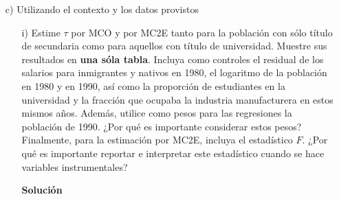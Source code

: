 \documentclass[a4paper, answers, addpoints, 11pt]{exam}
\newenvironment{solucion}{%
  \begin{mdframed}[
    backgroundcolor=blue!5,    %
    linecolor=blue!50,          %
    linewidth=2pt,              %
    leftmargin=10pt,            %
    rightmargin=8pt,           %
    topline=true,              %
    bottomline=true,            %
    roundcorner=10pt,           %
    innerleftmargin=10pt,       %
    innerrightmargin=10pt,      %
    innerbottommargin=10pt,     %
    innertopmargin=10pt         %
  ]%
  \begin{tcolorbox}[colframe=blue!50!black, colback=blue!50, coltitle=white, sharp corners=all, boxrule=1mm, width=\textwidth, halign=left, valign=center, top=0mm, bottom=0mm, left=0mm, right=0mm] \textbf{Solución} \end{tcolorbox} }{\end{mdframed}}
\begin{document}
\begin{itemize}
    \item[c)] Utilizando el contexto y los datos provistos
    
    \begin{itemize}
     
    
    
    \item[i)] Estime $\tau$ por MCO y por MC2E tanto para la población con sólo título de secundaria como para aquellos con título de universidad. Muestre sus resultados en \textbf{una sóla tabla}. Incluya como controles el residual de los salarios para inmigrantes y nativos en 1980, el logaritmo de la población en 1980 y en 1990, así como la proporción de estudiantes en la universidad y la fracción que ocupaba la industria manufacturera en estos mismos años. Además, utilice como pesos para las regresiones la población de 1990. ¿Por qué es importante considerar estos pesos? \\
    
    Finalmente, para la estimación por MC2E, incluya el estadístico $F$. ¿Por qué es importante reportar e interpretar este estadístico cuando se hace variables instrumentales? \\
    
\begin{solucion}



\end{solucion}
\end{itemize}
\end{itemize}
\end{document}
